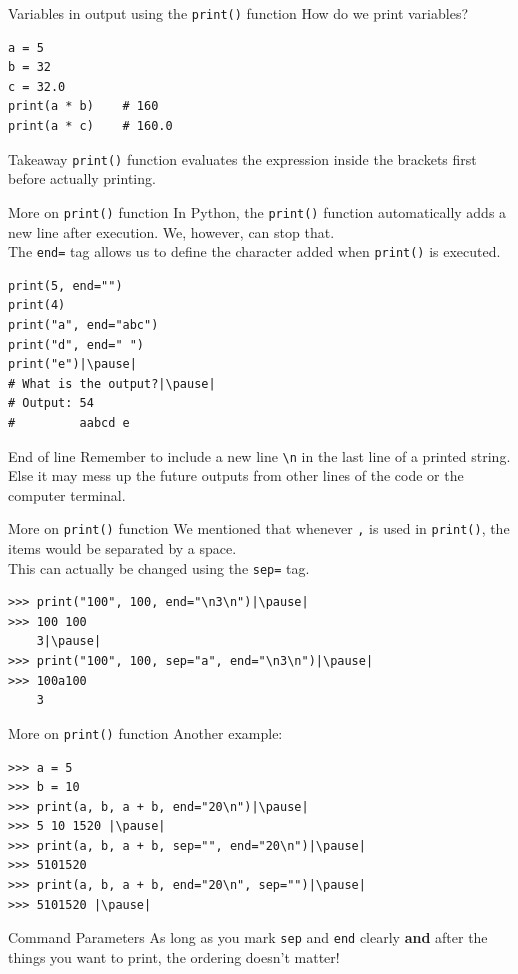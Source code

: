 \documentclass[dvipsnames, svgnames, x11names]{beamer}
\begin{document}
\begin{frame}[fragile]{Variables in output using the \texttt{print()} function}
How do we print variables?

\begin{verbatim}
a = 5
b = 32
c = 32.0
print(a * b)    # 160
print(a * c)    # 160.0
\end{verbatim}
\pause
\begin{block}{Takeaway}
\texttt{print()} function evaluates the expression inside the brackets first before actually printing.
\end{block}
\end{frame}

\begin{frame}[fragile]{More on \texttt{print()} function}
In Python, the \texttt{print()} function automatically adds a new line after execution. We, however, can stop that.\\
The \texttt{end=} tag allows us to define the character added when \texttt{print()} is executed.
\begin{verbatim}
print(5, end="")
print(4)
print("a", end="abc")
print("d", end=" ")
print("e")|\pause|
# What is the output?|\pause|
# Output: 54
#         aabcd e
\end{verbatim}
\begin{block}{End of line}
Remember to include a new line {\color{BrickRed}\texttt{\textbackslash n}} in the last line of a printed string.\\
Else it may mess up the future outputs from other lines of the code or the computer terminal.
\end{block}
\end{frame}

\begin{frame}[fragile]{More on \texttt{print()} function}
We mentioned that whenever \texttt{,} is used in \texttt{print()}, the items would be separated by a space.\\
This can actually be changed using the \texttt{sep=} tag.\pause
\begin{verbatim}
>>> print("100", 100, end="\n3\n")|\pause|
>>> 100 100
	3|\pause|
>>> print("100", 100, sep="a", end="\n3\n")|\pause|
>>> 100a100
	3
\end{verbatim}

\end{frame}

\begin{frame}[fragile]{More on \texttt{print()} function}
Another example:
\begin{verbatim}
>>> a = 5
>>> b = 10
>>> print(a, b, a + b, end="20\n")|\pause|
>>> 5 10 1520 |\pause|
>>> print(a, b, a + b, sep="", end="20\n")|\pause|
>>> 5101520	
>>> print(a, b, a + b, end="20\n", sep="")|\pause|
>>> 5101520	|\pause|
\end{verbatim}
\begin{block}{Command Parameters}
As long as you mark \texttt{sep} and \texttt{end} clearly \textbf{and} after the things you want to print, the ordering doesn't matter!
\end{block}
\end{frame}
\end{document}
